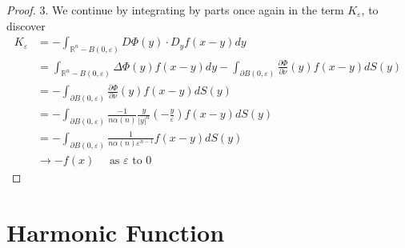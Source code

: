 \begin{theorem}
\begin{proof}
        3. We continue by integrating by parts once again in the term $K_{\varepsilon}$, to discover
        \begin{equation*}
            \begin{aligned}
                K_{\varepsilon} & = -\int_{\mathbb{R}^n-B(0, \varepsilon)} D \Phi(y) \cdot D_y f(x-y) d y                                                                                \\
                                & =\int_{\mathbb{R}^n-B(0, \varepsilon)} \Delta \Phi(y) f(x-y) d y-\int_{\partial B(0, \varepsilon)} \frac{\partial \Phi}{\partial \nu}(y) f(x-y) d S(y) \\
                                & =-\int_{\partial B(0, \varepsilon)} \frac{\partial \Phi}{\partial \nu}(y) f(x-y) d S(y)                                                                \\
                                & = -\int_{\partial B(0, \varepsilon)}
                \frac{-1}{n \alpha(n)} \frac{y}{|y|^n} \left(-\frac{y}{\varepsilon}\right) f(x-y)  d S(y)                                                                                \\
                                & = -\int_{\partial B(0, \varepsilon)} \frac{1}{n \alpha(n) \varepsilon^{n-1}} f(x-y) d S(y)                                                             \\
                                & \to -f(x) \quad \text{ as } \varepsilon \text{ to } 0
            \end{aligned}
        \end{equation*}

    \end{proof}
\end{theorem}
\section{Harmonic Function}

